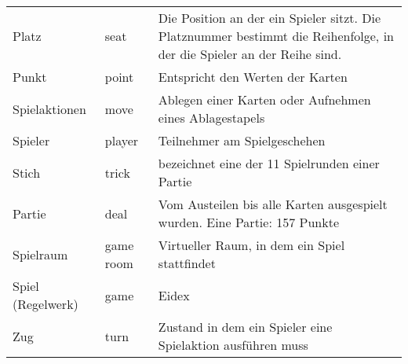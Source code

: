 \begin{center}
\begin{longtable}{p{} p{} p{}}
			Platz & seat & Die Position an der ein Spieler sitzt. Die Platznummer bestimmt die Reihenfolge, in der die Spieler an der Reihe sind. \\
			Punkt & point & Entspricht den Werten der Karten \\
			Spielaktionen & move & Ablegen einer Karten oder Aufnehmen eines Ablagestapels\\
			Spieler & player & Teilnehmer am Spielgeschehen\\
			Stich & trick & bezeichnet eine der 11 Spielrunden einer Partie\\
			Partie & deal & Vom Austeilen bis alle Karten ausgespielt wurden. Eine Partie: 157 Punkte\\
			Spielraum & game room & Virtueller Raum, in dem ein Spiel stattfindet\\
			Spiel (Regelwerk) & game & Eidex \\
			Zug & turn & Zustand in dem ein Spieler eine Spielaktion ausführen muss\\
		\end{longtable}
	\end{center}